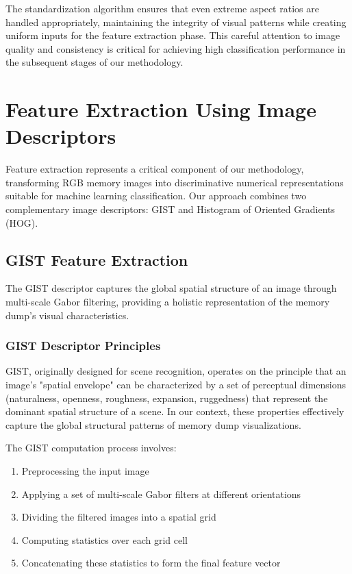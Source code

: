 The standardization algorithm ensures that even extreme aspect ratios are handled appropriately, maintaining the integrity of visual patterns while creating uniform inputs for the feature extraction phase. This careful attention to image quality and consistency is critical for achieving high classification performance in the subsequent stages of our methodology.

\section{Feature Extraction Using Image Descriptors}
\label{sec:feature-extraction}

Feature extraction represents a critical component of our methodology, transforming RGB memory images into discriminative numerical representations suitable for machine learning classification. Our approach combines two complementary image descriptors: GIST and Histogram of Oriented Gradients (HOG).

\subsection{GIST Feature Extraction}
\label{subsec:gist-extraction}

The GIST descriptor captures the global spatial structure of an image through multi-scale Gabor filtering, providing a holistic representation of the memory dump's visual characteristics.

\subsubsection{GIST Descriptor Principles}

GIST, originally designed for scene recognition, operates on the principle that an image's "spatial envelope" can be characterized by a set of perceptual dimensions (naturalness, openness, roughness, expansion, ruggedness) that represent the dominant spatial structure of a scene. In our context, these properties effectively capture the global structural patterns of memory dump visualizations.

The GIST computation process involves:

\begin{enumerate}
    \item Preprocessing the input image
    \item Applying a set of multi-scale Gabor filters at different orientations
    \item Dividing the filtered images into a spatial grid
    \item Computing statistics over each grid cell
    \item Concatenating these statistics to form the final feature vector
\end{enumerate}


